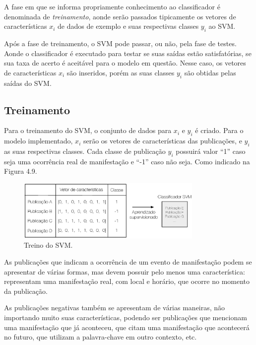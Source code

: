 A fase em que se informa propriamente conhecimento ao classificador é denominada de \textit{treinamento}, aonde serão passados tipicamente os vetores de características ${x_i}$ de dados de exemplo e suas respectivas classes ${y_i}$ ao SVM.

Após a fase de treinamento, o SVM pode passar, ou não, pela fase de testes. Aonde o classificador é executado para testar se suas saídas estão satisfatórias, se sua taxa de acerto é aceitável para o modelo em questão. Nesse caso, os vetores de características ${x_i}$ são inseridos, porém as suas classes ${y_i}$ são obtidas pelas saídas do SVM.

\subsection{Treinamento}

Para o treinamento do SVM, o conjunto de dados para ${x_i}$ e ${y_i}$ é criado. Para o modelo implementado, ${x_i}$ serão os vetores de características das publicações, e ${y_i}$ as suas respectivas classes. Cada classe de publicação ${y_i}$ possuirá valor ``1'' caso seja uma ocorrência real de manifestação e ``-1'' caso não seja. Como indicado na Figura 4.9. 

\begin{figure}[htpb]
	\begin{center}
		\includegraphics[width=0.8\textwidth]{figuras/inducao-aprendizado-supervisionado.eps}
		\caption{Treino do SVM.}
	\end{center}
\end{figure}

As publicações que indicam a ocorrência de um evento de manifestação podem se apresentar de várias formas, mas devem possuir pelo menos uma característica: representam uma manifestação real, com local e horário, que ocorre no momento da publicação.

As publicações negativas também se apresentam de várias maneiras, não importando muito suas características, podendo ser publicações que mencionam uma manifestação que já aconteceu, que citam uma manifestação que acontecerá no futuro, que utilizam a palavra-chave em outro contexto, etc. 

